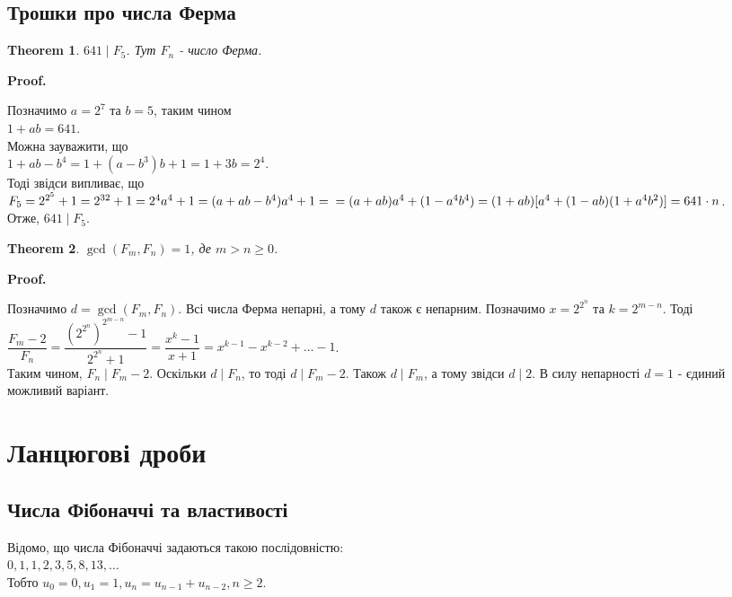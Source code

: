\documentclass[a4paper, 14pt]{extarticle}
\makeatletter
\theoremstyle{theoremdd}
\newtheorem{theorem}{Theorem}[subsection]
\theoremstyle{theoremdd}
\theoremstyle{theoremdd}
\theoremstyle{theoremdd}
\theoremstyle{theoremdd}
\theoremstyle{theoremdd}
\theoremstyle{theoremdd}
\theoremstyle{theoremdd}
\def\qed{$\blacksquare$}
\renewenvironment{proof}[1][Proof.\\]{\par
\pushQED{\hfill \qed}%
\normalfont \topsep6\p@\@plus6\p@\relax
\trivlist
\item\relax
{\bfseries
#1\@addpunct{.}}\hspace\labelsep\ignorespaces
}{%
\popQED\endtrivlist\@endpefalse
}
\makeatother
\begin{document}
\subsection{Трошки про числа Ферма}
\begin{theorem}
$641 \mid F_5$. Тут $F_n$ - число Ферма.
\end{theorem}

\begin{proof}
Позначимо $a = 2^7$ та $b =5$, таким чином\\
$1 + ab = 641$.\\
Можна зауважити, що\\
$1 + ab - b^4 = 1+(a-b^3)b+1 = 1+3b = 2^4$.\\
Тоді звідси випливає, що\\
$F_5 = 2^{2^5}+1 = 2^{32}+1 = 2^4 a^4+1 = (a+ab-b^4)a^4+1 = \\ = (a+ab)a^4+(1-a^4b^4)= (1+ab)[a^4+(1-ab)(1+a^4b^2)] = 641 \cdot n$.\\
Отже, $641 \mid F_5$.
\end{proof}

\begin{theorem}
$\gcd(F_m,F_n) = 1$, де $m>n\geq 0$.
\end{theorem}

\begin{proof}
Позначимо $d = \gcd(F_m,F_n)$. Всі числа Ферма непарні, а тому $d$ також є непарним. Позначимо $x = 2^{2^n}$ та $k = 2^{m-n}$. Тоді\\
$\dfrac{F_m-2}{F_n} = \dfrac{(2^{2^n})^{2^{m-n}}-1}{2^{2^n}+1} = \dfrac{x^k-1}{x+1} = x^{k-1} - x^{k-2} + \dots -1$.\\
Таким чином, $F_n \mid F_m-2$. Оскільки $d \mid F_n$, то тоді $d \mid F_m-2$. Також $d \mid F_m$, а тому звідси $d \mid 2$. В силу непарності $d=1$ - єдиний можливий варіант.
\end{proof}
\newpage

\section{Ланцюгові дроби}
\subsection{Числа Фібоначчі та властивості}
Відомо, що числа Фібоначчі задаються такою послідовністю:\\
$0,1,1,2,3,5,8,13,\dots$\\
Тобто $u_0 = 0, u_1 = 1, u_n = u_{n-1} + u_{n-2}, n \geq 2$.
\end{document}
